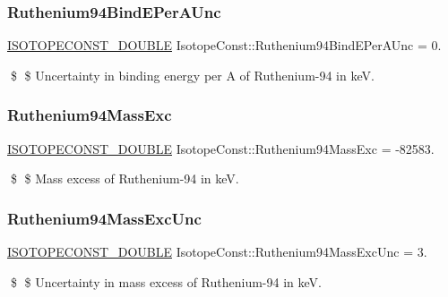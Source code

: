 \subsubsection{\texorpdfstring{Ruthenium94\+Bind\+E\+Per\+A\+Unc}{Ruthenium94BindEPerAUnc}}
{\footnotesize\ttfamily \mbox{\hyperlink{group___isotope_const-_macros_ga8f45a7272ce02c0b4c65c44636ed719a}{I\+S\+O\+T\+O\+P\+E\+C\+O\+N\+S\+T\+\_\+\+D\+O\+U\+B\+LE}} Isotope\+Const\+::\+Ruthenium94\+Bind\+E\+Per\+A\+Unc = 0.}

\$ \$ Uncertainty in binding energy per A of Ruthenium-\/94 in keV. \mbox{\label{group___isotope_const-_ruthenium-_ru94_ga1c1ffcb3022c1e093d4682718d335cbc}} 
\subsubsection{\texorpdfstring{Ruthenium94\+Mass\+Exc}{Ruthenium94MassExc}}
{\footnotesize\ttfamily \mbox{\hyperlink{group___isotope_const-_macros_ga8f45a7272ce02c0b4c65c44636ed719a}{I\+S\+O\+T\+O\+P\+E\+C\+O\+N\+S\+T\+\_\+\+D\+O\+U\+B\+LE}} Isotope\+Const\+::\+Ruthenium94\+Mass\+Exc = -\/82583.}

\$ \$ Mass excess of Ruthenium-\/94 in keV. \mbox{\label{group___isotope_const-_ruthenium-_ru94_ga996dfec7c8299e84caa3f5efbd4d9492}} 
\subsubsection{\texorpdfstring{Ruthenium94\+Mass\+Exc\+Unc}{Ruthenium94MassExcUnc}}
{\footnotesize\ttfamily \mbox{\hyperlink{group___isotope_const-_macros_ga8f45a7272ce02c0b4c65c44636ed719a}{I\+S\+O\+T\+O\+P\+E\+C\+O\+N\+S\+T\+\_\+\+D\+O\+U\+B\+LE}} Isotope\+Const\+::\+Ruthenium94\+Mass\+Exc\+Unc = 3.}

\$ \$ Uncertainty in mass excess of Ruthenium-\/94 in keV. \mbox{\label{group___isotope_const-_ruthenium-_ru94_gad4b92330cacf5779d1186abbbd93e342}} 
